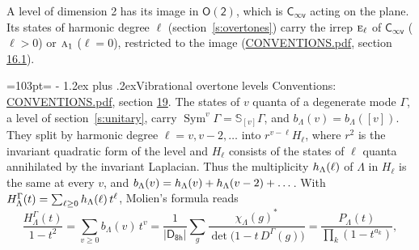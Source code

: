 \documentclass[10pt,a4paper]{article}
\makeatletter
\renewcommand\section{\@startsection{section}{1}{\z@}{-3ex plus -1ex minus -.2ex}%
  {1.2ex plus .2ex}{\normalfont\large\sffamily\bfseries\color{parttitle}}}
\newcommand{\needspace}[1]{\par\penalty-100\begingroup\dimen0=#1\relax\dimen2=\pagegoal
  \advance\dimen2-\pagetotal\ifdim\dimen0>\dimen2\relax\ifdim\dimen2>0pt\vfil\break\fi\fi
  \endgroup}
\numberwithin{equation}{section}
\newcommand{\grp}[1]{\mathsf{#1}}
\newcommand{\irr}[1]{\text{\normalfont\scshape #1}}
\newcommand{\repD}[1]{D^{#1}}
\newcommand{\irchar}[1]{\chi_{#1}}
\newcommand{\conj}[1]{{#1}^{*}}
\newcommand{\schur}[1]{\mathbb{S}_{#1}}
\newcommand{\shape}[1]{[#1]}
\makeatother
\begin{document}
A level of dimension 2 has its image in $\grp{O(2)}$, which is \href{Cinfv.pdf}{$\grp{C_{\infty v}}$} acting on the plane. \label{n:index.harmonic.degree}Its states of harmonic degree $\ell$ (section~\ref{s:overtones}) carry the irrep $\irr{e}_{\ell}$ of \href{Cinfv.pdf}{$\grp{C_{\infty v}}$} ($\ell > 0$) or $\irr{a}_{1}$ ($\ell = 0$), restricted to the image (\href{../../CONVENTIONS.pdf}{CONVENTIONS.pdf}, section \href{../../CONVENTIONS.pdf\#conv.16.1}{16.1}).
\needspace{103pt}
\section{Vibrational overtone levels}\label{s:overtones}
Conventions: \href{../../CONVENTIONS.pdf}{CONVENTIONS.pdf}, section \href{../../CONVENTIONS.pdf\#conv.19}{19}.
\leavevmode\label{n:index.quanta}\label{n:operator.symmetric.power}The states of $v$ quanta of a degenerate mode $\Gamma$, a level of section~\ref{s:unitary}, carry $\operatorname{Sym}^{v}\Gamma = \schur{\shape{v}}\Gamma$, and $b_\Lambda(v) = b_\Lambda(\shape{v})$. \label{n:local.quadratic.form}\label{n:set.harmonic}They split by harmonic degree $\ell = v, v - 2, \dots$ into $r^{v-\ell}H_\ell$, where $r^2$ is the invariant quadratic form of the level and $H_\ell$ consists of the states of $\ell$ quanta annihilated by the invariant Laplacian. \label{n:function.multiplicity.harmonic}Thus the multiplicity $\mathnormal{h}_\Lambda(\ell)$ of $\Lambda$ in $H_\ell$ is the same at every $v$, and $b_\Lambda(v) = \mathnormal{h}_\Lambda(v) + \mathnormal{h}_\Lambda(v - 2) + \dots$. \label{n:function.generating.level}With $H^{\Gamma}_\Lambda(t) = \sum_{\ell\ge0} \mathnormal{h}_\Lambda(\ell)\,t^{\ell}$, Molien's formula reads
\begin{equation}\label{e:molien}\frac{H^{\Gamma}_\Lambda(t)}{1 - t^2} = \sum_{v\ge0} b_\Lambda(v)\,t^v = \frac{1}{|\grp{D_{8h}}|}\sum_{g}\frac{\conj{\irchar{\Lambda}(g)}}{\det\bigl(1 - t\,\repD{\Gamma}(g)\bigr)} = \frac{P_\Lambda(t)}{\prod_k (1-t^{a_k})},\end{equation}
\end{document}
